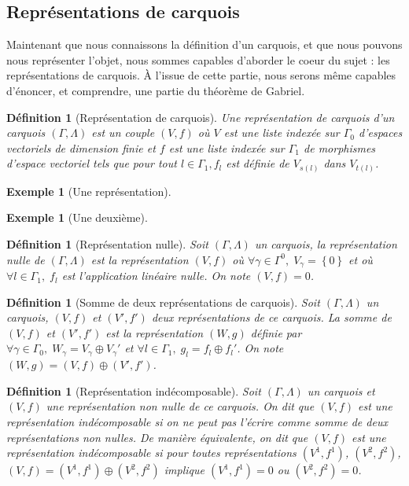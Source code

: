 \documentclass[a4paper,10pt]{article}
\newtheorem{defi}[]{Définition}[section]
\newtheorem{ex}[]{Exemple}[section]
\begin{document}
\subsection{Représentations de carquois}
Maintenant que nous connaissons la définition d'un carquois, et que nous pouvons nous représenter l'objet, nous sommes capables d'aborder le coeur du sujet : les représentations de carquois. À l'issue de cette partie, nous serons même capables d'énoncer, et comprendre, une partie du théorème de Gabriel.
\begin{defi}[Représentation de carquois]
  Une représentation de carquois d'un carquois $(\Gamma,\Lambda)$ est un couple $(V,f)$ où $V$ est une liste indexée sur $\Gamma_0$ d'espaces vectoriels de dimension finie et $f$ est une liste indexée sur $\Gamma_1$ de morphismes d'espace vectoriel tels que pour tout $l \in \Gamma_1, f_l$ est définie de $V_{s(l)}$ dans $V_{t(l)}$.
\end{defi}
\begin{ex}[Une représentation]
\end{ex}
\begin{ex}[Une deuxième]
\end{ex}
\begin{defi}[Représentation nulle]
	Soit $(\Gamma,\Lambda)$ un carquois, la représentation nulle de $(\Gamma,\Lambda)$ est la représentation $(V,f)$ où $\forall\gamma\in\Gamma^{0},\;V_{\gamma}=\left\{ 0 \right\}$ et où $\forall l \in\Gamma_{1},\;f_{l}$ est l'application linéaire nulle. On note $(V,f)=0$.
\end{defi}
\begin{defi}[Somme de deux représentations de carquois]
	Soit $(\Gamma,\Lambda)$ un carquois, $(V,f)$ et $(V',f')$ deux représentations de ce carquois. La somme de $(V,f)$ et $(V',f')$ est la représentation $(W,g)$ définie par $\forall\gamma\in\Gamma_{0},\;W_{\gamma}=V_{\gamma}\oplus V_{\gamma}'$ et $\forall l \in\Gamma_{1},\;g_{l}=f_{l}\oplus f_{l}'$. On note $(W,g)=(V,f)\oplus (V',f')$.
\end{defi}
\begin{defi}[Représentation indécomposable]
	Soit $(\Gamma,\Lambda)$ un carquois et $(V,f)$ une représentation non nulle de ce carquois. On dit que $(V,f)$ est une représentation indécomposable si on ne peut pas l'écrire comme somme de deux représentations non nulles. De manière équivalente, on dit que $(V,f)$ est une représentation indécomposable si pour toutes représentations $(V^{1},f^{1})$, $(V^{2},f^{2})$, $(V,f)=(V^{1},f^{1})\oplus(V^{2},f^{2})$ implique $(V^{1},f^{1})=0$ ou $(V^{2},f^{2})=0$.
\end{defi}
\end{document}
